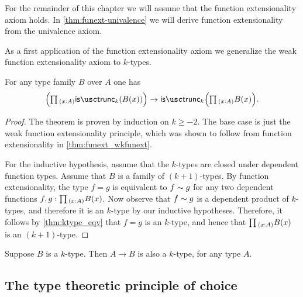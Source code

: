 For the remainder of this chapter we will assume that the function extensionality axiom holds. In \cref{thm:funext-univalence} we will derive function extensionality from the univalence axiom. 

As a first application of the function extensionality axiom we generalize the weak function extensionality axiom to $k$-types.

\begin{thm}\label{thm:trunc_pi}
For any type family $B$ over $A$ one has
\begin{equation*}
\Big(\prd{x:A}\istrunc{k}(B(x))\Big)\to \istrunc{k}\Big(\prd{x:A}B(x)\Big).
\end{equation*}
\end{thm}

\begin{proof}
The theorem is proven by induction on $k\geq -2$. The base case is just the weak function extensionality principle, which was shown to follow from function extensionality in \cref{thm:funext_wkfunext}.

For the inductive hypothesis, assume that the $k$-types are closed under dependent function types. Assume that $B$ is a family of $(k+1)$-types. By function extensionality, the type $f=g$ is equivalent to $f\sim g$ for any two dependent functions $f,g:\prd{x:A}B(x)$. Now observe that $f\sim g$ is a dependent product of $k$-types, and therefore it is an $k$-type by our inductive hypotheses. Therefore, it follows by \cref{thm:ktype_eqv} that $f=g$ is an $k$-type, and hence that $\prd{x:A}B(x)$ is an $(k+1)$-type.
\end{proof}

\begin{cor}\label{cor:funtype_trunc}
Suppose $B$ is a $k$-type. Then $A\to B$ is also a $k$-type, for any type $A$.
\end{cor}

\subsection{The type theoretic principle of choice}

